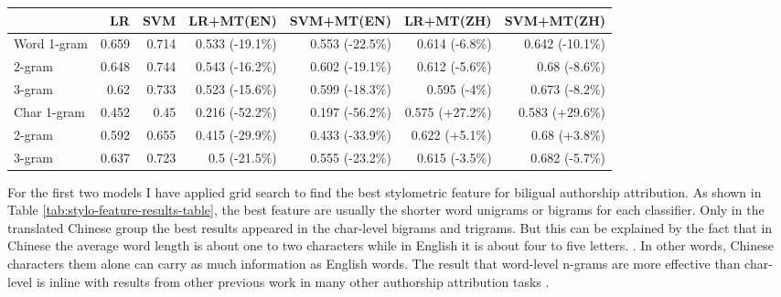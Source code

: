 \documentclass[11pt,a4paper]{article}
\begin{document}
\begin{table*}[t]
  \begin{center}
  \begin{tabular}{|l|r|r|r|r|r|r|}
  \hline & \bf LR & \bf SVM & \bf LR+MT(EN) & \bf SVM+MT(EN) & \bf LR+MT(ZH) & \bf SVM+MT(ZH) \\ \hline
  Word 1-gram & 0.659 & 0.714 & 0.533 (-19.1\%) & 0.553 (-22.5\%) & 0.614 (-6.8\%) & 0.642 (-10.1\%) \\
  \hspace{0.5cm} 2-gram & 0.648 & 0.744 & 0.543 (-16.2\%) & 0.602 (-19.1\%) & 0.612 (-5.6\%) & 0.68 (-8.6\%) \\
  \hspace{0.5cm} 3-gram & 0.62 & 0.733 & 0.523 (-15.6\%) & 0.599 (-18.3\%) & 0.595 (-4\%) & 0.673 (-8.2\%) \\
  Char 1-gram & 0.452 & 0.45 & 0.216 (-52.2\%) & 0.197 (-56.2\%) & 0.575 (+27.2\%) & 0.583 (+29.6\%) \\
  \hspace{0.5cm} 2-gram & 0.592 & 0.655 & 0.415 (-29.9\%) & 0.433 (-33.9\%) & 0.622 (+5.1\%) & 0.68 (+3.8\%) \\
  \hspace{0.5cm} 3-gram & 0.637 & 0.723 & 0.5 (-21.5\%) & 0.555 (-23.2\%) & 0.615 (-3.5\%) & 0.682 (-5.7\%) \\
  \hline
  \end{tabular}
  \end{center}
  \caption{\label{tab:stylo-feature-results-table} Results for the Vanilla Model and the Machine Translation Model}
\end{table*}

For the first two models I have applied grid search to find the best stylometric feature for biligual authorship attribution. As shown in Table \ref{tab:stylo-feature-results-table}, the best feature are usually the shorter word unigrams or bigrams for each classifier. Only in the translated Chinese group the best results appeared in the char-level bigrams and trigrams. But this can be explained by the fact that in Chinese the average word length is about one to two characters while in English it is about four to five letters.  \cite{chen2015does} \cite{bochkarev2015average}. In other words, Chinese characters them alone can carry as much information as English words. The result that word-level n-grams are more effective than char-level is inline with results from other previous work in many other authorship attribution tasks \cite{kestemont2018overview} \cite{rangel2019overview}.
\end{document}
